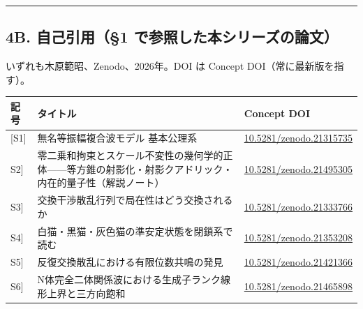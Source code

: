 \documentclass[
  10pt,
]{ltjsarticle}
\newcounter{none} %
\begin{document}
\begin{center}\rule{0.5\linewidth}{0.5pt}\end{center}

\subsection{4B. 自己引用（§1
で参照した本シリーズの論文）}\label{b.-ux81eaux5df1ux5f15ux75281-ux3067ux53c2ux7167ux3057ux305fux672cux30b7ux30eaux30fcux30baux306eux8ad6ux6587}

いずれも木原範昭、Zenodo、2026年。DOI は Concept
DOI（常に最新版を指す）。

{\def\LTcaptype{none} %
\begin{longtable}[]{@{}
  >{\raggedright\arraybackslash}p{}
  >{\raggedright\arraybackslash}p{}
  >{\raggedright\arraybackslash}p{}@{}}
\toprule\noalign{}
\begin{minipage}[b]{\linewidth}\raggedright
記号
\end{minipage} & \begin{minipage}[b]{\linewidth}\raggedright
タイトル
\end{minipage} & \begin{minipage}[b]{\linewidth}\raggedright
Concept DOI
\end{minipage} \\
\midrule\noalign{}
\endhead
\bottomrule\noalign{}
\endlastfoot
{[}S1{]} & 無名等振幅複合波モデル 基本公理系 &
\href{https://doi.org/10.5281/zenodo.21315735}{10.5281/zenodo.21315735} \\
{[}S2{]} &
零二乗和拘束とスケール不変性の幾何学的正体------等方錐の射影化・射影クアドリック・内在的量子性（解説ノート）
&
\href{https://doi.org/10.5281/zenodo.21495305}{10.5281/zenodo.21495305} \\
{[}S3{]} & 交換干渉散乱行列で局在性はどう交換されるか &
\href{https://doi.org/10.5281/zenodo.21333766}{10.5281/zenodo.21333766} \\
{[}S4{]} & 白猫・黒猫・灰色猫の準安定状態を閉鎖系で読む &
\href{https://doi.org/10.5281/zenodo.21353208}{10.5281/zenodo.21353208} \\
{[}S5{]} & 反復交換散乱における有限位数共鳴の発見 &
\href{https://doi.org/10.5281/zenodo.21421366}{10.5281/zenodo.21421366} \\
{[}S6{]} & N体完全二体関係波における生成子ランク線形上界と三方向飽和 &
\href{https://doi.org/10.5281/zenodo.21465898}{10.5281/zenodo.21465898} \\

\end{longtable}}
\end{document}
